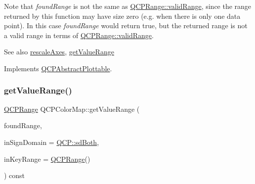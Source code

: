 Note that {\itshape found\+Range} is not the same as \hyperlink{class_q_c_p_range_ab38bd4841c77c7bb86c9eea0f142dcc0}{Q\+C\+P\+Range\+::valid\+Range}, since the range returned by this function may have size zero (e.\+g. when there is only one data point). In this case {\itshape found\+Range} would return true, but the returned range is not a valid range in terms of \hyperlink{class_q_c_p_range_ab38bd4841c77c7bb86c9eea0f142dcc0}{Q\+C\+P\+Range\+::valid\+Range}.

\begin{DoxySeeAlso}{See also}
\hyperlink{class_q_c_p_abstract_plottable_a1491c4a606bccd2d09e65e11b79eb882}{rescale\+Axes}, \hyperlink{class_q_c_p_color_map_a88134493aaf6b297af34eaab65264fff}{get\+Value\+Range} 
\end{DoxySeeAlso}


Implements \hyperlink{class_q_c_p_abstract_plottable_a4da16d3cd4b509e1104a9b0275623c96}{Q\+C\+P\+Abstract\+Plottable}.

\mbox{\label{class_q_c_p_color_map_a88134493aaf6b297af34eaab65264fff}} 
\subsubsection{\texorpdfstring{get\+Value\+Range()}{getValueRange()}}
{\footnotesize\ttfamily \hyperlink{class_q_c_p_range}{Q\+C\+P\+Range} Q\+C\+P\+Color\+Map\+::get\+Value\+Range (\begin{DoxyParamCaption}\item[{bool \&}]{found\+Range,  }\item[{\hyperlink{namespace_q_c_p_afd50e7cf431af385614987d8553ff8a9}{Q\+C\+P\+::\+Sign\+Domain}}]{in\+Sign\+Domain = {\ttfamily \hyperlink{namespace_q_c_p_afd50e7cf431af385614987d8553ff8a9aa38352ef02d51ddfa4399d9551566e24}{Q\+C\+P\+::sd\+Both}},  }\item[{const \hyperlink{class_q_c_p_range}{Q\+C\+P\+Range} \&}]{in\+Key\+Range = {\ttfamily \hyperlink{class_q_c_p_range}{Q\+C\+P\+Range}()} }\end{DoxyParamCaption}) const\hspace{0.3cm}{\ttfamily [virtual]}}


